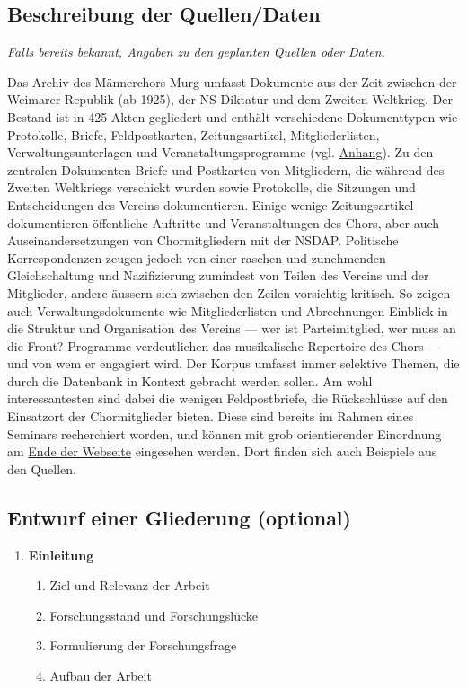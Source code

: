\documentclass[12pt, a4paper, ngerman, bidi=default]{article}
\begin{document}
\begin{spacing}{1.5}
\subsection{\textbf{Beschreibung der Quellen/Daten}}
\textit{Falls bereits bekannt, Angaben zu den geplanten Quellen oder Daten.}

Das Archiv des Männerchors Murg umfasst Dokumente aus der Zeit zwischen der Weimarer Republik (ab 1925), der NS-Diktatur und dem Zweiten Weltkrieg. Der Bestand ist in 425 Akten gegliedert und enthält verschiedene Dokumenttypen wie Protokolle, Briefe, Feldpostkarten, Zeitungsartikel, Mitgliederlisten, Verwaltungsunterlagen und Veranstaltungsprogramme (vgl. \hyperref[sec:Anhang Datenbankstruktur]{Anhang}).
Zu den zentralen Dokumenten Briefe und Postkarten von Mitgliedern, die während des Zweiten Weltkriegs verschickt wurden sowie Protokolle, die Sitzungen und Entscheidungen des Vereins dokumentieren. Einige wenige Zeitungsartikel dokumentieren öffentliche Auftritte und Veranstaltungen des Chors, aber auch Auseinandersetzungen von Chormitgliedern mit der NSDAP. Politische Korrespondenzen zeugen jedoch von einer raschen und zunehmenden Gleichschaltung und Nazifizierung zumindest von Teilen des Vereins und der Mitglieder, andere äussern sich zwischen den Zeilen vorsichtig kritisch.
So zeigen auch Verwaltungsdokumente wie Mitgliederlisten und Abrechnungen Einblick in die Struktur und Organisation des Vereins --- wer ist Parteimitglied, wer muss an die Front? Programme verdeutlichen das musikalische Repertoire des Chors ---  und von wem er engagiert wird.
Der Korpus umfasst immer selektive Themen, die durch die Datenbank in Kontext gebracht werden sollen. Am wohl interessantesten sind dabei die wenigen Feldpostbriefe, die Rückschlüsse auf den Einsatzort der Chormitglieder bieten. Diese sind bereits im Rahmen eines Seminars recherchiert worden, und können mit grob orientierender Einordnung am  \href{https://storymaps.arcgis.com/stories/ec8a4b675cac476380df910304a47547}{Ende der Webseite} eingesehen werden. Dort finden sich auch Beispiele aus den Quellen. 

\subsection{\textbf{Entwurf einer Gliederung (optional)}}
\begin{enumerate}
    \item \textbf{Einleitung}
    \begin{enumerate}
        \item \small Ziel und Relevanz der Arbeit
        \item \small Forschungsstand und Forschungslücke
        \item \small Formulierung der Forschungsfrage
        \item \small Aufbau der Arbeit
    \end{enumerate}
    

\end{enumerate}
\end{spacing}
\end{document}
